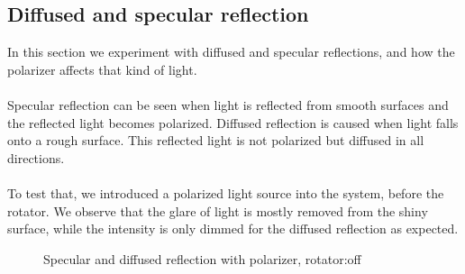 \documentclass[english]{article}
\begin{document}
\subsection{Diffused and specular reflection}
In this section we experiment with diffused and specular reflections, and how the polarizer affects that kind of light.\\
\\
Specular reflection can be seen when light is reflected from smooth surfaces and the reflected light becomes polarized.
Diffused reflection is caused when light falls onto a rough surface. 
This reflected light is not polarized but diffused in all directions.\\
\\
To test that, we introduced a polarized light source into the system, before the rotator. 
We observe that the glare of light is mostly removed from the shiny surface, while the intensity is only dimmed for the diffused reflection as expected.\\

\begin{figure}[H]
	\centering
	\caption{Specular and diffused reflection with polarizer, rotator:off}
	\label{fig:eight}
\end{figure}
\end{document}
